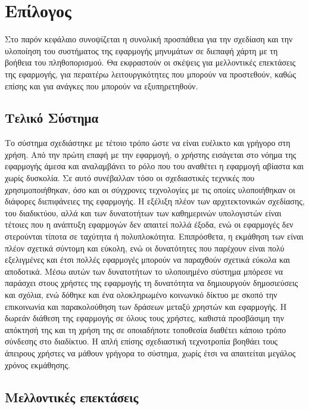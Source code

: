 \chapter{Επίλογος}
\label{chap7}

Στο παρόν κεφάλαιο συνοψίζεται η συνολική προσπάθεια για την σχεδίαση και την υλοποίηση του συστήματος της εφαρμογής μηνυμάτων σε διεπαφή χάρτη με τη βοήθεια του πληθοπορισμού. Θα εκφραστούν οι σκέψεις για μελλοντικές επεκτάσεις της εφαρμογής, για περαιτέρω λειτουργικότητες που μπορούν να προστεθούν, καθώς επίσης και για ανάγκες που μπορούν να εξυπηρετηθούν.

\section{Τελικό Σύστημα}
Το σύστημα σχεδιάστηκε με τέτοιο τρόπο ώστε να είναι ευέλικτο και γρήγορο στη χρήση. Από την πρώτη επαφή με την εφαρμογή, ο χρήστης εισάγεται στο νόημα της εφαρμογής άμεσα και αναλαμβάνει το ρόλο που του αναθέτει η εφαρμογή αβίαστα και χωρίς δυσκολία. Σε αυτό συνέβαλλαν τόσο οι σχεδιαστικές τεχνικές που χρησιμοποιήθηκαν, όσο και οι σύγχρονες τεχνολογίες με τις οποίες υλοποιήθηκαν οι διάφορες διεπιφάνειες της εφαρμογής. Η εξέλιξη πλέον των αρχιτεκτονικών σχεδίασης, του διαδικτύου, αλλά και των δυνατοτήτων των καθημερινών υπολογιστών είναι τέτοιες που η ανάπτυξη εφαρμογών δεν απαιτεί πολλά έξοδα, ενώ οι εφαρμογές δεν στερούνται τίποτα σε ταχύτητα ή πολυπλοκότητα. Επιπρόσθετα, η εκμάθηση των  είναι πλέον σχετικά σύντομη και εύκολη, ενώ οι δυνατότητες που παρέχουν είναι πολύ εξελιγμένες και έτσι πολλές εφαρμογές μπορούν να παραχθούν σχετικά εύκολα και αποδοτικά. Μέσω αυτών των δυνατοτήτων το υλοποιημένο σύστημα μπόρεσε να παράσχει στους χρήστες της εφαρμογής τη δυνατότητα να δημιουργούν δημοσιεύσεις και σχόλια, ενώ δόθηκε και ένα ολοκληρωμένο κοινωνικό δίκτυο με σκοπό την επικοινωνία και παρακολούθηση των δράσεων μεταξύ χρηστών και εφαρμογής. Η δωρεάν διάθεση της εφαρμογής σε όλους τους χρήστες, καθιστά προσβάσιμη την απόκτησή της και τη χρήση της σε οποιαδήποτε τοποθεσία διαθέτει κάποιο τρόπο σύνδεσης στο διαδίκτυο. Η απλή επίσης σχεδιαστική τεχνοτροπία βοηθάει τους άπειρους χρήστες να μάθουν γρήγορα το σύστημα, χωρίς έτσι να απαιτείται μεγάλος χρόνος εκμάθησης.


\section{Μελλοντικές επεκτάσεις}

